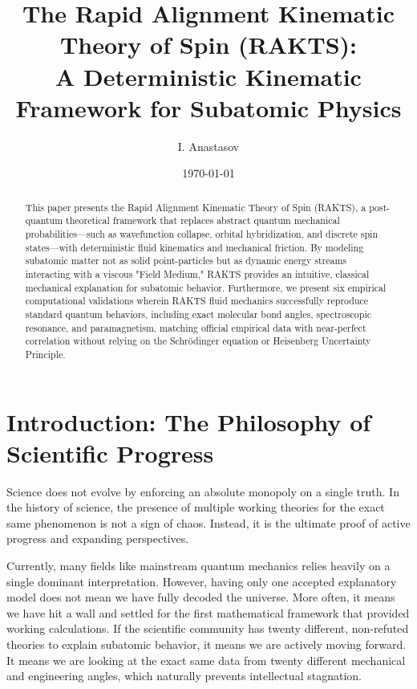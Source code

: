 \documentclass[reprint,amsmath,amssymb,aps,prd,twocolumn]{revtex4-2}
\begin{document}
\title{The Rapid Alignment Kinematic Theory of Spin (RAKTS): \\ A Deterministic Kinematic Framework for Subatomic Physics}
\author{I. Anastasov}
\date{\today}

\begin{abstract}
This paper presents the Rapid Alignment Kinematic Theory of Spin (RAKTS), a post-quantum theoretical framework that replaces abstract quantum mechanical probabilities—such as wavefunction collapse, orbital hybridization, and discrete spin states—with deterministic fluid kinematics and mechanical friction. By modeling subatomic matter not as solid point-particles but as dynamic energy streams interacting with a viscous "Field Medium," RAKTS provides an intuitive, classical mechanical explanation for subatomic behavior. Furthermore, we present six empirical computational validations wherein RAKTS fluid mechanics successfully reproduce standard quantum behaviors, including exact molecular bond angles, spectroscopic resonance, and paramagnetism, matching official empirical data with near-perfect correlation without relying on the Schrödinger equation or Heisenberg Uncertainty Principle.
\end{abstract}

\maketitle

\section{Introduction: The Philosophy of Scientific Progress}

Science does not evolve by enforcing an absolute monopoly on a single truth. In the history of science, the presence of multiple working theories for the exact same phenomenon is not a sign of chaos. Instead, it is the ultimate proof of active progress and expanding perspectives.

Currently, many fields like mainstream quantum mechanics relies heavily on a single dominant interpretation. However, having only one accepted explanatory model does not mean we have fully decoded the universe. More often, it means we have hit a wall and settled for the first mathematical framework that provided working calculations. If the scientific community has twenty different, non-refuted theories to explain subatomic behavior, it means we are actively moving forward. It means we are looking at the exact same data from twenty different mechanical and engineering angles, which naturally prevents intellectual stagnation.
\end{document}
